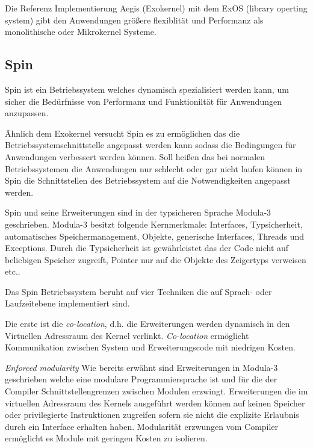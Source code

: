 \documentclass[9pt,technote]{IEEEtran}
\begin{document}
        Die Referenz Implementierung Aegis (Exokernel) mit dem ExOS (library operting system) gibt den Anwendungen gr\"o\ss ere flexiblit\"at 
        und Performanz als monolithische oder Mikrokernel Systeme. 
        
        
    \subsection{Spin}
       Spin ist ein Betriebssystem welches dynamisch spezialisiert werden kann, um sicher die Bed\"urfnisse von Performanz und Funktionilt\"at f\"ur
       Anwendungen anzupassen.
    
      \"Ahnlich dem Exokernel versucht Spin es zu erm\"oglichen das die Betriebssystemschnittstelle angepasst werden kann sodass die Bedingungen f\"ur Anwendungen verbessert werden k\"onnen.
      Soll hei\ss en das bei normalen Betriebssystemen die Anwendungen nur schlecht oder gar nicht laufen k\"onnen in Spin die Schnittstellen des Betriebssystem auf die Notwendigkeiten angepasst werden.
      
      Spin und seine Erweiterungen sind in der typsicheren Sprache Modula-3 geschrieben. Modula-3 besitzt folgende Kernmerkmale: Interfaces, Typsicherheit, automatisches Speichermanagement,
      Objekte, generische Interfaces, Threads und Exceptions. Durch die Typsicherheit ist gew\"ahrleistet das der Code nicht auf beliebigen Speicher zugreift, Pointer nur auf die Objekte
      des Zeigertyps verweisen etc..
      
      Das Spin Betriebssystem beruht auf vier Techniken die auf Sprach- oder Laufzeitebene implementiert sind.
      
      Die erste ist die \textit{co-location}, d.h. die Erweiterungen werden dynamisch in den Virtuellen Adressraum des Kernel verlinkt.
      \textit{Co-location} erm\"oglicht Kommunikation zwischen System und Erweiterungscode mit niedrigen Kosten.
      
      \textit{Enforced modularity}  Wie bereits erw\"ahnt sind Erweiterungen in Modula-3 geschrieben welche eine modulare
      Programmiersprache ist und f\"ur die der Compiler Schnittstellengrenzen zwischen Modulen erzwingt.
      Erweiterungen die im virtuellen Adressraum des Kernels ausgef\"uhrt werden k\"onnen auf keinen Speicher oder privilegierte Instruktionen zugreifen sofern sie nicht
      die explizite Erlaubnis durch ein Interface erhalten haben. Modularit\"at erzwungen vom Compiler erm\"oglicht es Module mit geringen Kosten zu isolieren.
      
\end{document}
